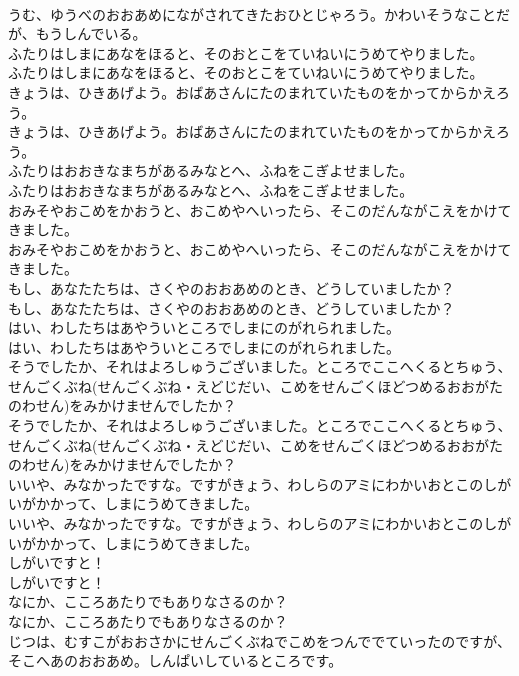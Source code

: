 \documentclass[8pt]{extreport}
\begin{document}
\begin{CJK}{UTF8}{min}
\\	うむ、ゆうべのおおあめにながされてきたおひとじゃろう。かわいそうなことだが、もうしんでいる。
\\	ふたりはしまにあなをほると、そのおとこをていねいにうめてやりました。
\\	ふたりはしまにあなをほると、そのおとこをていねいにうめてやりました。
\\	きょうは、ひきあげよう。おばあさんにたのまれていたものをかってからかえろう。
\\	きょうは、ひきあげよう。おばあさんにたのまれていたものをかってからかえろう。
\\	ふたりはおおきなまちがあるみなとへ、ふねをこぎよせました。
\\	ふたりはおおきなまちがあるみなとへ、ふねをこぎよせました。
\\	おみそやおこめをかおうと、おこめやへいったら、そこのだんながこえをかけてきました。
\\	おみそやおこめをかおうと、おこめやへいったら、そこのだんながこえをかけてきました。
\\	もし、あなたたちは、さくやのおおあめのとき、どうしていましたか？
\\	もし、あなたたちは、さくやのおおあめのとき、どうしていましたか？
\\	はい、わしたちはあやういところでしまにのがれられました。
\\	はい、わしたちはあやういところでしまにのがれられました。
\\	そうでしたか、それはよろしゅうございました。ところでここへくるとちゅう、せんごくぶね(せんごくぶね・えどじだい、こめをせんごくほどつめるおおがたのわせん)をみかけませんでしたか？
\\	そうでしたか、それはよろしゅうございました。ところでここへくるとちゅう、せんごくぶね(せんごくぶね・えどじだい、こめをせんごくほどつめるおおがたのわせん)をみかけませんでしたか？
\\	いいや、みなかったですな。ですがきょう、わしらのアミにわかいおとこのしがいがかかって、しまにうめてきました。
\\	いいや、みなかったですな。ですがきょう、わしらのアミにわかいおとこのしがいがかかって、しまにうめてきました。
\\	しがいですと！
\\	しがいですと！
\\	なにか、こころあたりでもありなさるのか？
\\	なにか、こころあたりでもありなさるのか？
\\	じつは、むすこがおおさかにせんごくぶねでこめをつんででていったのですが、そこへあのおおあめ。しんぱいしているところです。

\end{CJK}
\end{document}
